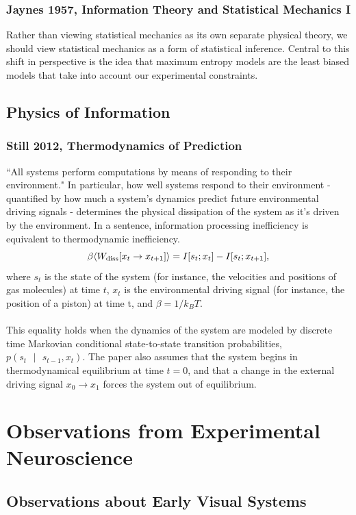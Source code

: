 \documentclass{article}
\newcommand{\given}{\mbox{ } | \mbox{ }}
\begin{document}
\subsubsection{Jaynes 1957, Information Theory and Statistical Mechanics I}
Rather than viewing statistical mechanics as its own separate physical theory, we should view statistical mechanics as a form of statistical inference.  Central to this shift in perspective is the idea that maximum entropy models are the least biased models that take into account our experimental constraints.

\subsection{Physics of Information}
\subsubsection{Still 2012, Thermodynamics of Prediction}
``All systems perform computations by means of responding to their environment."  In particular, how well systems respond to their environment - quantified by how much a system's dynamics predict future environmental driving signals - determines the physical dissipation of the system as it's driven by the environment.  In a sentence, information processing inefficiency is equivalent to thermodynamic inefficiency.
\begin{equation}
\beta \langle W_{\rm diss} [x_t \to x_{t + 1}] \rangle = I[s_t; x_t] - I[s_t; x_{t + 1}],
\end{equation}
where $s_t$ is the state of the system (for instance, the velocities and positions of gas molecules) at time $t$, $x_t$ is the environmental driving signal (for instance, the position of a piston) at time t, and $\beta = 1/k_B T$. \\
\\
This equality holds when the dynamics of the system are modeled by discrete time Markovian conditional state-to-state transition probabilities, $p(s_t \given s_{t - 1}, x_t)$.  The paper also assumes that the system begins in thermodynamical equilibrium at time $t = 0$, and that a change in the external driving signal $x_0 \to x_1$ forces the system out of equilibrium.


\section{Observations from Experimental Neuroscience}
\subsection{Observations about Early Visual Systems}
\end{document}
